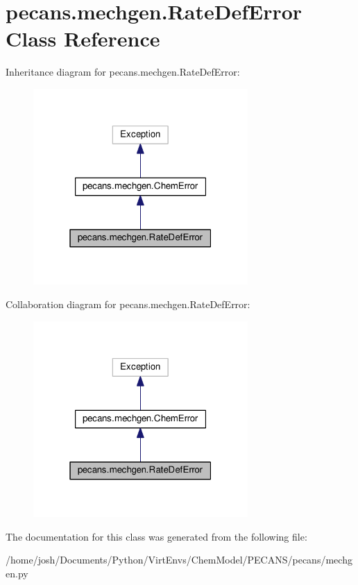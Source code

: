 \hypertarget{classpecans_1_1mechgen_1_1RateDefError}{}\section{pecans.\+mechgen.\+Rate\+Def\+Error Class Reference}
\label{classpecans_1_1mechgen_1_1RateDefError}


Inheritance diagram for pecans.\+mechgen.\+Rate\+Def\+Error\+:\nopagebreak
\begin{figure}[H]
\begin{center}
\leavevmode
\includegraphics[width=232pt]{classpecans_1_1mechgen_1_1RateDefError__inherit__graph}
\end{center}
\end{figure}


Collaboration diagram for pecans.\+mechgen.\+Rate\+Def\+Error\+:\nopagebreak
\begin{figure}[H]
\begin{center}
\leavevmode
\includegraphics[width=232pt]{classpecans_1_1mechgen_1_1RateDefError__coll__graph}
\end{center}
\end{figure}


The documentation for this class was generated from the following file\+:\begin{DoxyCompactItemize}
\item 
/home/josh/\+Documents/\+Python/\+Virt\+Envs/\+Chem\+Model/\+P\+E\+C\+A\+N\+S/pecans/mechgen.\+py\end{DoxyCompactItemize}

